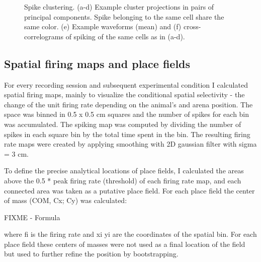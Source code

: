 \begin{figure}
\captionsetup{format=plain}
\caption[Spikesorting]{
Spike clustering. (a-d) Example cluster projections in pairs of principal components. Spike belonging to the same cell share the same color. (e) Example waveforms (mean) and (f) cross-correlograms of spiking of the same cells as in (a-d).
}
\label{fig:F34_spikesorting}
\end{figure}


\subsection{Spatial firing maps and place fields}

For every recording session and subsequent experimental condition I calculated spatial firing maps, mainly to visualize the conditional spatial selectivity - the change of the unit firing rate depending on the animal’s and arena position. The space was binned in 0.5 x 0.5 cm squares and the number of spikes for each bin was accumulated. The spiking map was computed by dividing the number of spikes in each square bin by the total time spent in the bin. The resulting firing rate maps were created by applying smoothing with 2D gaussian filter with sigma = 3 cm.

To define the precise analytical locations of place fields, I calculated the areas above the 0.5 * peak firing rate (threshold) of each firing rate map, and each connected area was taken as a putative place field. For each place field the center of mass (COM, Cx; Cy) was calculated:

FIXME - Formula

where fi  is the firing rate and xi  yi  are the coordinates of the spatial bin. For each place field these centers of masses were not used as a final location of the field but used to further refine the position by bootstrapping.

